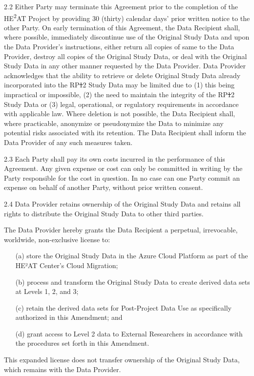 \documentclass[12pt,letterpaper]{article}
\newcommand{\deleted}[1]{\textcolor{deletecolor}{\sout{#1}}}
\newcommand{\added}[1]{\textcolor{addcolor}{#1}}
\begin{document}
2.2 Either Party may terminate this Agreement prior to the completion of the HE\textsuperscript{2}AT Project by providing 30 (thirty) calendar days' prior written notice to the other Party. On early termination of this Agreement, the Data Recipient shall, where possible, immediately discontinue use of the Original Study Data and upon the Data Provider's instructions, either return all copies of same to the Data Provider, destroy all copies of the Original Study Data, or deal with the Original Study Data in any other manner requested by the Data Provider. Data Provider acknowledges that the ability to retrieve or delete Original Study Data already incorporated into the RP\deleted{1}\added{2} Study Data may be limited due to (1) this being impractical or impossible, (2) the need to maintain the integrity of the RP\deleted{1}\added{2} Study Data or (3) legal, operational, or regulatory requirements in accordance with applicable law. Where deletion is not possible, the Data Recipient shall, where practicable, anonymize or pseudonymize the Data to minimize any potential risks associated with its retention. The Data Recipient shall inform the Data Provider of any such measures taken.

2.3 Each Party shall pay its own costs incurred in the performance of this Agreement. Any given expense or cost can only be committed in writing by the Party responsible for the cost in question. In no case can one Party commit an expense on behalf of another Party, without prior written consent.

2.4 Data Provider retains ownership of the Original Study Data and retains all rights to distribute the Original Study Data to other third parties. \added{The Data Provider hereby grants the Data Recipient a perpetual, irrevocable, worldwide, non-exclusive license to:
\begin{enumerate}
\item[(a)] store the Original Study Data in the Azure Cloud Platform as part of the HE²AT Center's Cloud Migration;
\item[(b)] process and transform the Original Study Data to create derived data sets at Levels 1, 2, and 3;
\item[(c)] retain the derived data sets for Post-Project Data Use as specifically authorized in this Amendment; and
\item[(d)] grant access to Level 2 data to External Researchers in accordance with the procedures set forth in this Amendment.
\end{enumerate}

This expanded license does not transfer ownership of the Original Study Data, which remains with the Data Provider.}
\end{document}
